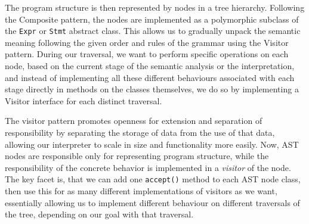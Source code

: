 The program structure is then represented by nodes in a tree hierarchy. Following the Composite pattern, the nodes are implemented as a polymorphic subclass of the \verb|Expr| or \verb|Stmt| abstract class.
This allows us to gradually unpack the semantic meaning following the given order and rules of the grammar using the Visitor pattern.
During our traversal, we want to perform specific operations on each node, based on the current stage of the semantic analysis or the interpretation, and instead of implementing all these different behaviours associated with each stage directly in methods on the classes themselves, we do so by implementing a Visitor interface for each distinct traversal. 

The visitor pattern promotes openness for extension and separation of responsibility by separating the storage of data from the use of that data, 
allowing our interpreter to scale in size and functionality more easily. 
Now, AST nodes are responsible only for representing program structure, while the responsibility of the concrete behavior is implemented in a \textit{visitor} of the node.
The key facet is, that we can add one 
\verb|accept()| method to each AST node class, then use this for as many different implementations of visitors as we want, essentially allowing us to implement different 
behaviour on different traversals of the tree, depending on our goal with that traversal.

